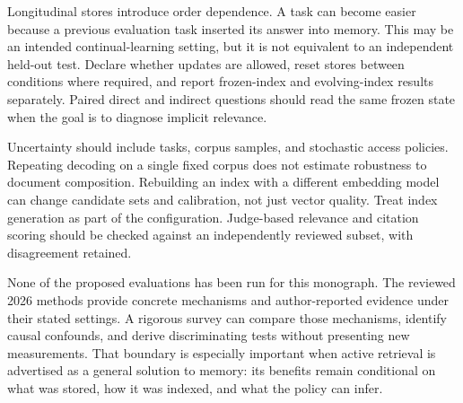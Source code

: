 Longitudinal stores introduce order dependence. A task can become easier because a previous evaluation task inserted its answer into memory. This may be an intended continual-learning setting, but it is not equivalent to an independent held-out test. Declare whether updates are allowed, reset stores between conditions where required, and report frozen-index and evolving-index results separately. Paired direct and indirect questions should read the same frozen state when the goal is to diagnose implicit relevance.

Uncertainty should include tasks, corpus samples, and stochastic access policies. Repeating decoding on a single fixed corpus does not estimate robustness to document composition. Rebuilding an index with a different embedding model can change candidate sets and calibration, not just vector quality. Treat index generation as part of the configuration. Judge-based relevance and citation scoring should be checked against an independently reviewed subset, with disagreement retained.

None of the proposed evaluations has been run for this monograph. The reviewed 2026 methods provide concrete mechanisms and author-reported evidence under their stated settings. A rigorous survey can compare those mechanisms, identify causal confounds, and derive discriminating tests without presenting new measurements. That boundary is especially important when active retrieval is advertised as a general solution to memory: its benefits remain conditional on what was stored, how it was indexed, and what the policy can infer.

